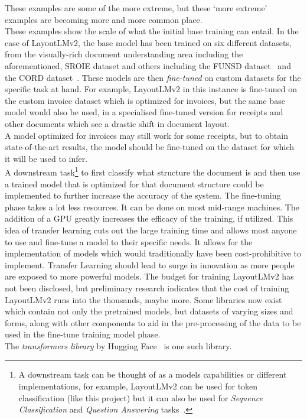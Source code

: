 These examples are some of the more extreme, but these `more extreme' examples are becoming more and more common place. \\
These examples show the scale of what the initial base training can entail.
\bigbreak
In the case of LayoutLMv2, the base model has been trained on six different datasets, from the
visually-rich document understanding area including the aforementioned, SROIE dataset and others including the FUNSD dataset~\autocite{FUNSD}
and the CORD dataset~\autocite{CORDConsolidatedReceipt2022}.
\bigbreak
These models are then \emph{fine-tuned} on custom datasets for the specific task at hand. For example, LayoutLMv2 in this instance is
fine-tuned on the custom invoice dataset which is optimized for invoices, but the same base model would also be used, in a specialised
fine-tuned version for receipts and other documents which see a drastic shift in document layout. \\
A model optimized for invoices may still work for some receipts, but to obtain
state-of-the-art results, the model should be fine-tuned on the dataset for which it will be used to infer.\\
A downstream task\footnote{A downstream task can be thought of as a models capabilities or different implementations, for example,
	LayoutLMv2 can be used for token classification (like this project) but it can also be used for \emph{Sequence Classification}
	and \emph{Question Answering} tasks~\autocite{LayoutLMV2}.} to first classify what structure the document is and then use a trained model that is optimized for
that document structure could be implemented to further increase the accuracy of the system.
\bigbreak
The fine-tuning phase takes a lot less resources. It can be done on most mid-range machines. The addition of a GPU greatly 
increases the efficacy of the training, if utilized. 
\bigbreak
This idea of transfer learning cuts out the large training time and allows most anyone to use and fine-tune a model to their specific needs.
It allows for the implementation of models which would traditionally have been cost-prohibitive to implement. Transfer Learning 
should lead to surge in innovation as more people are exposed to more powerful models. The budget for training LayoutLMv2 has not been 
disclosed, but preliminary research indicates that the cost of training LayoutLMv2 runs into the thousands, maybe more.
\bigbreak
Some libraries now exist which contain not only the pretrained models, but datasets of varying sizes and forms, along with other components
to aid in the pre-processing of the data to be used in the fine-tune training model phase.\\
The \emph{transformers library} by Hugging Face~\autocite{HuggingFaceAI} is one such library.
\newpage
